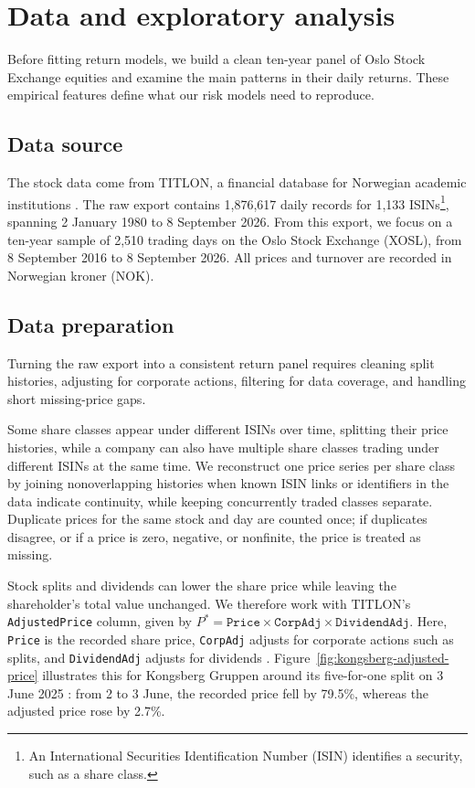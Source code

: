 \section{Data and exploratory analysis}
\label{sec:data-eda}

Before fitting return models, we build a clean ten-year panel of Oslo Stock
Exchange equities and examine the main patterns in their daily returns. These
empirical features define what our risk models need to reproduce.

\subsection{Data source}
\label{sec:data-source}

The stock data come from TITLON, a financial database for Norwegian academic
institutions \parencite{TITLON}. The raw export contains 1,876,617 daily
records for 1,133 ISINs\footnote{An International Securities Identification
Number (ISIN) identifies a security, such as a share class.}, spanning
2 January 1980 to 8 September 2026. From this export, we focus on a ten-year
sample of 2,510 trading days on the Oslo Stock Exchange (XOSL), from
8 September 2016 to 8 September 2026. All prices and turnover are recorded in
Norwegian kroner (NOK).

\subsection{Data preparation}
\label{sec:data-preparation}

Turning the raw export into a consistent return panel requires cleaning split
histories, adjusting for corporate actions, filtering for data coverage, and
handling short missing-price gaps.

Some share classes appear under different ISINs over time, splitting their
price histories, while a company can also have multiple share classes trading
under different ISINs at the same time. We reconstruct one price series per
share class by joining nonoverlapping histories when known ISIN links or
identifiers in the data indicate continuity, while keeping concurrently traded
classes separate. Duplicate prices for the same stock and day are counted once;
if duplicates disagree, or if a price is zero, negative, or nonfinite, the
price is treated as missing.

Stock splits and dividends can lower the share price while leaving the
shareholder's total value unchanged. We therefore work with TITLON's
\texttt{AdjustedPrice} column, given by
\mbox{\(P^{*}=\texttt{Price}\times\texttt{CorpAdj}\times\texttt{DividendAdj}\)}.
Here, \texttt{Price} is the recorded share price, \texttt{CorpAdj} adjusts for
corporate actions such as splits, and \texttt{DividendAdj} adjusts for dividends
\parencite{TITLONFields}. Figure~\ref{fig:kongsberg-adjusted-price} illustrates
this for Kongsberg Gruppen around its five-for-one split on 3 June 2025
\parencite[154]{KongsbergAnnualReport2025}: from 2 to 3 June, the recorded
price fell by 79.5\%, whereas the adjusted price rose by 2.7\%.


